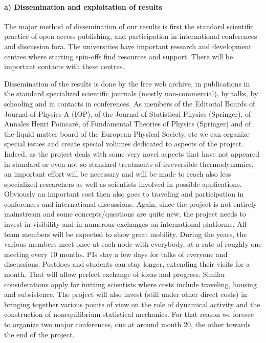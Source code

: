 \paragraph{a) Dissemination and exploitation of results}

The major method of dissemination of our results is first the standard scientific practice
of open access publishing, and participation in international conferences and discussion
fora. The universities have important research and development centres where starting
spin-offs find resources and support.
%
There will be important contacts with these centres.

Dissemination of the results is done by the free web archive, in publications in the
standard specialized scientific journals (mostly non-commercial), by talks, by schooling and
in contacts in conferences. As members of the Editorial Boards of Journal of Physics A  (IOP), of the Journal of Statistical Physics (Springer), of Annales Henri Poincar\'e, of
Fundamental Theories of Physics (Springer) and of the liquid matter board of the European Physical Society, etc we can organize special issues and create
special volumes dedicated to aspects of the project. Indeed, as the project deals with some
very novel aspects that have not appeared in standard or even not so standard treatments of
irreversible thermodynamics, an important effort will be necessary and will be made to reach
also less specialized researchers as well as scientists involved in possible applications.
%
Obviously an important cost then also goes to traveling and participation in conferences and
international discussions. Again, since the project is not entirely mainstream and some
concepts/questions are quite new, the project needs to invest in visibility and in numerous
exchanges on international platforms.  All team members will be
expected to show great mobility.  During the years, the various members meet once at each
node with everybody, at a rate of roughly one meeting every 10 months. PIs stay a few days
for talks of everyone and discussions. Postdocs and students can stay
longer, extending their visits for a month. That will allow perfect exchange of ideas and
progress.  Similar considerations apply for inviting scientists where
costs include traveling, housing and subsistence.  The project will also invest (still under other
direct costs) in bringing together various points of view on the role of dynamical activity
and the construction of nonequilibrium statistical mechanics. For that reason we foresee to
organize two major conferences, one at around month 20, the other towards the end of the
project.  


